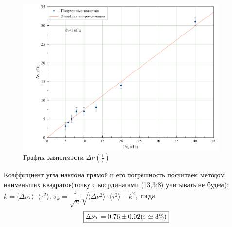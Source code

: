 \documentclass[a4paper, 12pt,twoside]{article}
\begin{document}
\begin{figure}[H]
\centering
\includegraphics[width = 0.95\textwidth]{graphic10}
\caption{График зависимости $\Delta \nu (\frac{1}{\tau})$}
\end{figure}

Коэффициент угла наклона прямой и его погрешность посчитаем методом наименьших квадратов(точку с координатами (13,3;8) учитывать не будем): $k = \langle \Delta \nu \tau \rangle \cdot \langle \tau^2 \rangle$, $\sigma_k = \dfrac{1}{\sqrt{n}} \sqrt{\langle \Delta \nu^2 \rangle \cdot \langle \tau^2 \rangle - k^2}$, тогда 
\begin{equation}
\fbox{$\Delta \nu \tau = 0.76 \pm 0.02 (\varepsilon \simeq 3\%)$}
\end{equation}
\end{document}
